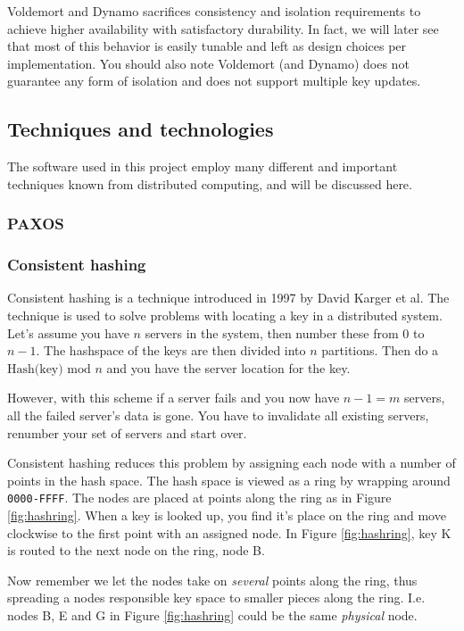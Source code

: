 Voldemort and Dynamo sacrifices consistency and isolation requirements to achieve higher availability with satisfactory durability.
In fact, we will later see that most of this behavior is easily tunable and left as design choices per implementation.
You should also note Voldemort (and Dynamo) does not guarantee any form of isolation and does not support multiple key updates.

\subsection{Techniques and technologies}
The software used in this project employ many different and important techniques known from distributed computing, and will be discussed here.

\subsubsection{PAXOS}

\subsubsection{Consistent hashing}
\label{sec:consistenthashing}
Consistent hashing is a technique introduced in 1997 by David Karger et al.\cite{Karger97consistenthashing}
The technique is used to solve problems with locating a key in a distributed system.
Let's assume you have $n$ servers in the system, then number these from $0$ to $n-1$.
The hashspace of the keys are then divided into $n$ partitions. Then do a $\textrm{Hash(key) mod } n$ and you have the server location for the key.

However, with this scheme if a server fails and you now have $n-1=m$ servers, all the failed server's data is gone.
You have to invalidate all existing servers, renumber your set of servers and start over.

Consistent hashing reduces this problem by assigning each node with a number of points in the hash space.
The hash space is viewed as a ring by wrapping around \texttt{0000-FFFF}. The nodes are placed at points along the ring as in Figure \ref{fig:hashring}. When a key is looked up, you find it's place on the ring and move clockwise to the first point with an assigned node. In Figure \ref{fig:hashring}, key K is routed to the next node on the ring, node B.

Now remember we let the nodes take on \emph{several} points along the ring, thus spreading a nodes responsible key space to smaller pieces along the ring.
I.e. nodes B, E and G in Figure \ref{fig:hashring} could be the same \emph{physical} node.

